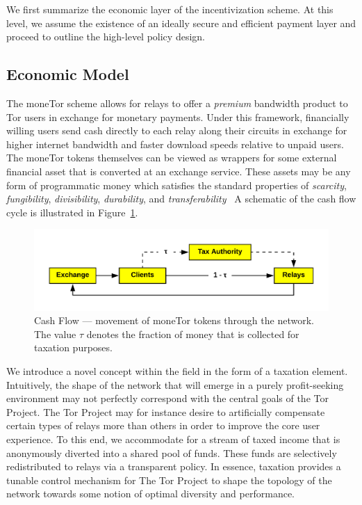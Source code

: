 
We first summarize the economic layer of the incentivization scheme. At this
level, we assume the existence of an ideally secure and efficient payment layer
and proceed to outline the high-level policy design. 

\subsection{Economic Model}
The moneTor scheme allows for relays to offer a \emph{premium} bandwidth product
to Tor users in exchange for monetary payments. Under this framework,
financially willing users send cash directly to each relay along their circuits
in exchange for higher internet bandwidth and faster download speeds relative to
unpaid users. The moneTor tokens themselves can be viewed as wrappers for some
external financial asset that is converted at an exchange service. These assets
may be any form of programmatic money which satisfies the standard properties of
\textit{scarcity}, \textit{fungibility}, \textit{divisibility},
\textit{durability}, and
\textit{transferability}~\cite[p.3]{crump2011phenomenon} A schematic of the cash
flow cycle is illustrated in Figure~\ref{fig:economic}.
\begin{figure}[h] \centering
  \includegraphics[trim={0.5cm, 0.5cm, 0.5cm, 0.5cm}, clip, scale=0.7]{images/economic_diagram.png}
  \caption[Cash Flow]{Cash Flow --- movement of moneTor tokens through the
    network. The value $\tau$ denotes the fraction of money that is collected
    for taxation purposes.}
  \label{fig:economic}
\end{figure}
We introduce a novel concept within the field in the form of a taxation
element. Intuitively, the shape of the network that will emerge in a purely
profit-seeking environment may not perfectly correspond with the central goals
of the Tor Project. The Tor Project may for instance desire to artificially
compensate certain types of relays more than others in order to improve the core
user experience. To this end, we accommodate for a stream of taxed income that is
anonymously diverted into a shared pool of funds. These funds are selectively
redistributed to relays via a transparent policy.  In essence, taxation provides
a tunable control mechanism for The Tor Project to shape the topology of the
network towards some notion of optimal diversity and performance.


